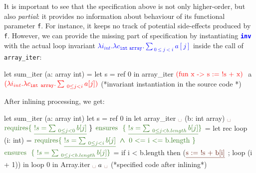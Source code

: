 \documentclass[a4paper,11pt,oneside]{article}
\theoremstyle{plain}
\newcommand{\bwedge}{\boldsymbol{~\wedge~}}
\begin{document}
It is important to see that the specification above is not only higher-order, but also \textit{partial}: it provides no information about behaviour of its functional parameter \texttt{f}. 
	For instance, it keeps no track of potential side-effects produced by \texttt{f}. 
	However, we can provide the missing part of specification by instantiating  \textcolor{blue}{\texttt{\textbf{inv}}} with the actual loop invariant \textcolor{blue}{$\lambda i_{int}.\lambda c_{\texttt{int array}}. \sum_{~0\leq j < i} a[j] $} inside the call of \texttt{array\_iter}:
\begin{small}
\begin{whycode} 
 let sum_iter (a: array int) =		 
   let s = ref 0 in 
   array_iter $\textcolor{red}{\text{(fun x -> s := !s + x)}}~$ a $\textcolor{red}{(\lambda i_{int}.\lambda c_{\texttt{int array}}. \sum_{~0\leq j < i} a[j])}$                    
                                   (*invariant instantiation in the source code *)
\end{whycode}
\end{small}

After inlining processing, we get:

\begin{footnotesize}
\begin{whycode}  
   let sum_iter (a: array int)		
     let s = ref 0 in
     let array_iter $\textcolor{Sepia}{\text{\textvisiblespace}}$ (b: int array) $\textcolor{Sepia}{\text{\textvisiblespace}}$
     $\textcolor{OliveGreen}{\text{requires} \{~\underline{!s = \sum_{~0\leq j < 0} b[j]}}~\}$      
     $\textcolor{OliveGreen}{\text{ensures~~}\{~\underline{!s = \sum_{~0\leq j < b.length} b[j]}\}}$    
     = let rec loop (i: int) = 
         $\textcolor{OliveGreen}{ \text{requires} \{~\underline{!s = \sum_{~0\leq j < i} b[j] } \bwedge \text{0 <= i <= b.length}~\}}$
         $\textcolor{OliveGreen}{\text{ensures~~}\{~\underline{!s = \sum_{~0\leq j < b.length} b[j]}\}}$   
         = if i < b.length then  
         ($\textcolor{Sepia}{\text{\underline{s := !s + b[i]}}}$ ; 
          loop (i + 1)) 
       in loop 0   
     in Array.iter $\textcolor{Sepia}{\text{\textvisiblespace}}~a~\textcolor{Sepia}{\text{\textvisiblespace}}$   
               (*specified code after inlining*)
 	\end{whycode}
 \end{footnotesize}
\end{document}
